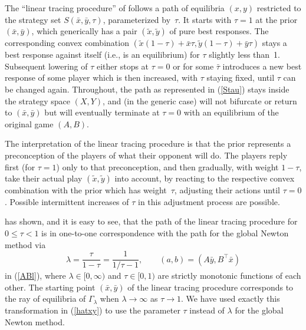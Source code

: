 \documentclass[a4paper,12pt]{article}  %
\theoremstyle{definition}
\newcommand{\T}{^{\top}}
\newcommand{\0}{{\mathbf0}}
\newcommand{\1}{{\mathbf1}}
\begin{document}
The ``linear tracing procedure'' of \citet{vdET99}
follows a path of equilibria $(x, y)$
restricted to the strategy set $S(\bar x, \bar y, \tau)$,
parameterized by~$\tau$.
It starts with $\tau=1$ at the prior $(\bar x,\bar y)$,
which generically has a pair $(\tilde x,\tilde y)$ of pure best
responses.
The corresponding convex combination 
$(\tilde x(1-\tau)+\bar x\tau,\tilde y(1-\tau)+\bar y\tau)$
stays a best response against itself (i.e., is an
equilibrium) for $\tau$ slightly less than~1.
Subsequent lowering of $\tau$ either stops at $\tau=0$ or
for some $\bar\tau$ introduces a new best response
of some player which is then increased, with $\tau$ staying
fixed, until $\tau$ can be changed again.
Throughout, the path as represented in (\ref{Stau}) stays
inside the strategy space $(X,Y)$, and (in the generic case)
will not bifurcate or return to $(\bar x,\bar y)$ but will
eventually terminate at $\tau=0$ with an equilibrium of the
original game $(A,B)$. 

The interpretation of the linear tracing procedure is that
the prior represents a preconception of the players of what
their opponent will do.
The players reply first (for $\tau=1$) only to that
preconception, and then gradually, with weight $1-\tau$,
take their actual play $(\tilde x,\tilde y)$ into account, by
reacting to the respective convex combination with the
prior which has weight~$\tau$, adjusting their actions until
$\tau=0$.
Possible intermittent increases of $\tau$ in this adjustment
process are possible.

\citet{balthasar2010} has shown, and it is easy to see, that
the path of the linear tracing procedure for $0\le\tau<1$ is
in one-to-one correspondence with the path for the global
Newton method via
\begin{equation}
\label{Ntra}
\lambda=\frac{\tau}{1-\tau}=\frac1{1/\tau-1},\qquad
(a,b)=(A\bar y, B\T \bar x)
\end{equation}
in (\ref{ABl}), where $\lambda\in[0,\infty)$ and
$\tau\in[0,1)$ are strictly monotonic functions of each
other.
The starting point $(\bar x,\bar y)$ of the linear tracing
procedure corresponds to the ray of equilibria of
$\Gamma_\lambda$ when $\lambda\to\infty$ as $\tau\to1$.
We have used exactly this transformation in (\ref{hatxy}) to
use the parameter $\tau$ instead of $\lambda$ for the global
Newton method.
\end{document}
